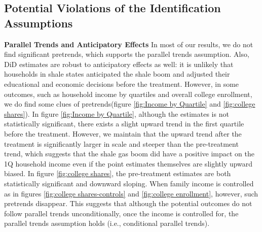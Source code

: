 \subsection{Potential Violations of the Identification Assumptions}
\label{subsec:assumptions}

\textbf{Parallel Trends and Anticipatory Effects} \hspace{0.1cm} In most of our results, we do not find significant pretrends, which supports the parallel trends assumption.
Also, DiD estimates are robust to anticipatory effects as well: it is unlikely that households in shale states anticipated the shale boom and adjusted their educational and economic decisions before the treatment.
However, in some outcomes, such as household income by quartiles and overall college enrollment, we do find some clues of pretrends(figure \ref{fig:Income by Quartile} and \ref{fig:college shares}).
In figure \ref{fig:Income by Quartile}, although the estimates is not statistically significant, there exists a slight upward trend in the first quartile before the treatment.
However, we maintain that the upward trend after the treatment is significantly larger in scale and steeper than the pre-treatment trend, which suggests that the shale gas boom did have a positive impact on the 1Q household income even if 
the point estimates themselves are slightly upward biased.
In figure \ref{fig:college shares}, 
the pre-treatment estimates are both statistically significant and downward sloping. 
When family income is controlled as in figures \ref{fig:college shares-controls} and \ref{fig:college enrollment}, however, such pretrends disappear. 
This suggests that although the potential outcomes do not follow parallel trends unconditionally, once the income is controlled for, the parallel trends assumption holds (i.e., conditional parallel trends).

